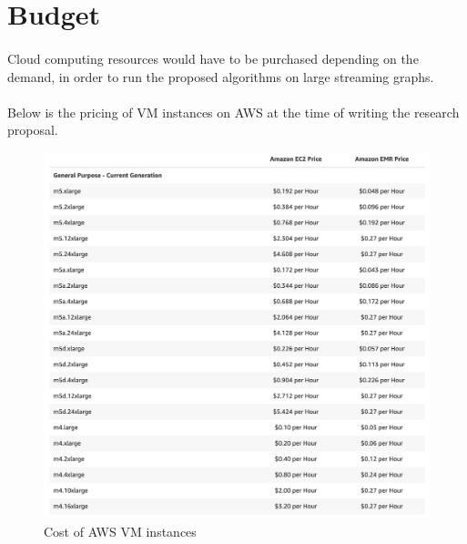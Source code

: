\section{Budget}

\paragraph{}
Cloud computing resources 
would have to be purchased depending on the demand, in order to run 
the proposed algorithms on large streaming graphs.

\paragraph{}
Below is the pricing of VM instances on AWS at the time of writing the research
proposal\cite{amazon_pricing}. 

\begin{figure}[h]
    \centering
    \includegraphics[width=\textwidth]{images/vm_cost}
    \caption{Cost of AWS VM instances}
\end{figure}